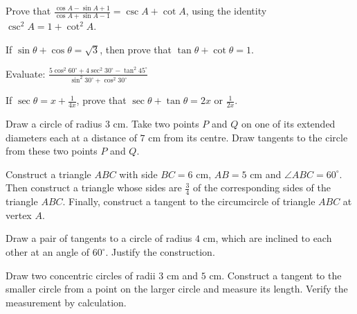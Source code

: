 \documentclass[12pt,a4paper]{exam}
\begin{document}
\begin{questions}
\question[5] Prove that $\frac{\cos A - \sin A + 1}{\cos A + \sin A - 1} = \csc A + \cot A$, using the identity $\csc^2 A = 1 + \cot^2 A$.
\vspace{0.15cm}

\question[5] If $\sin \theta + \cos \theta = \sqrt{3}$, then prove that $\tan \theta + \cot \theta = 1$.
\vspace{0.15cm}

\question[5] Evaluate: $\frac{5 \cos^2 60^\circ + 4 \sec^2 30^\circ - \tan^2 45^\circ}{\sin^2 30^\circ + \cos^2 30^\circ}$
\vspace{0.15cm}

\question[5] If $\sec \theta = x + \frac{1}{4x}$, prove that $\sec \theta + \tan \theta = 2x$ or $\frac{1}{2x}$.
\vspace{0.15cm}

\question[5] Draw a circle of radius $3 \text{ cm}$. Take two points $P$ and $Q$ on one of its extended diameters each at a distance of $7 \text{ cm}$ from its centre. Draw tangents to the circle from these two points $P$ and $Q$.
\vspace{0.15cm}

\question[5] Construct a triangle $ABC$ with side $BC = 6 \text{ cm}$, $AB = 5 \text{ cm}$ and $\angle ABC = 60^\circ$. Then construct a triangle whose sides are $\frac{3}{4}$ of the corresponding sides of the triangle $ABC$. Finally, construct a tangent to the circumcircle of triangle $ABC$ at vertex $A$.
\vspace{0.15cm}

\question[5] Draw a pair of tangents to a circle of radius $4 \text{ cm}$, which are inclined to each other at an angle of $60^\circ$. Justify the construction.
\vspace{0.15cm}

\question[5] Draw two concentric circles of radii $3 \text{ cm}$ and $5 \text{ cm}$. Construct a tangent to the smaller circle from a point on the larger circle and measure its length. Verify the measurement by calculation.
\vspace{0.15cm}

\end{questions}
\bigskip
\end{document}
